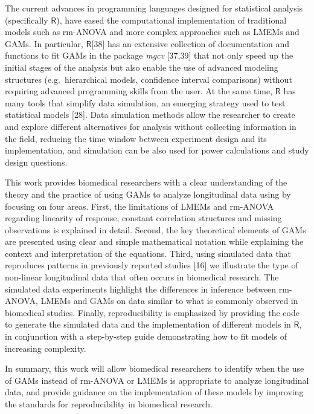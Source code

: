 \documentclass[
]{article}
\begin{document}
The current advances in programming languages designed for statistical analysis (specifically \(\textsf{R}\)), have eased the computational implementation of traditional models such as rm-ANOVA and more complex approaches such as LMEMs and GAMs. In particular, \(\textsf{R}\){[}38{]} has an extensive collection of documentation and functions to fit GAMs in the package \emph{mgcv} {[}37,39{]} that not only speed up the initial stages of the analysis but also enable the use of advanced modeling structures (e.g.~hierarchical models, confidence interval comparisons) without requiring advanced programming skills from the user. At the same time, \(\textsf{R}\) has many tools that simplify data simulation, an emerging strategy used to test statistical models {[}28{]}. Data simulation methods allow the researcher to create and explore different alternatives for analysis without collecting information in the field, reducing the time window between experiment design and its implementation, and simulation can be also used for power calculations and study design questions.

This work provides biomedical researchers with a clear understanding of the theory and the practice of using GAMs to analyze longitudinal data using by focusing on four areas. First, the limitations of LMEMs and rm-ANOVA regarding linearity of response, constant correlation structures and missing observations is explained in detail. Second, the key theoretical elements of GAMs are presented using clear and simple mathematical notation while explaining the context and interpretation of the equations. Third, using simulated data that reproduces patterns in previously reported studies {[}16{]} we illustrate the type of non-linear longitudinal data that often occurs in biomedical research. The simulated data experiments highlight the differences in inference between rm-ANOVA, LMEMs and GAMs on data similar to what is commonly observed in biomedical studies. Finally, reproducibility is emphasized by providing the code to generate the simulated data and the implementation of different models in \(\textsf{R}\), in conjunction with a step-by-step guide demonstrating how to fit models of increasing complexity.

In summary, this work will allow biomedical researchers to identify when the use of GAMs instead of rm-ANOVA or LMEMs is appropriate to analyze longitudinal data, and provide guidance on the implementation of these models by improving the standards for reproducibility in biomedical research.
\end{document}
